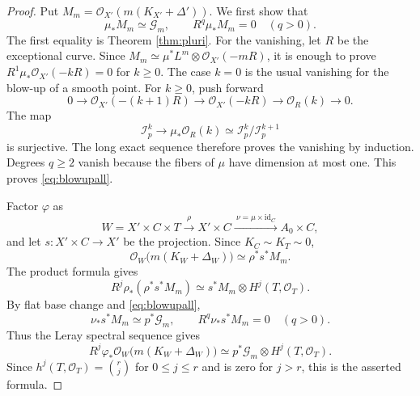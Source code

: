 \documentclass[11pt,letterpaper]{article}
\theoremstyle{paper}
\newcommand{\OO}{\mathcal O}
\newcommand{\GG}{\mathcal G}
\newcommand{\II}{\mathcal I}
\begin{document}
\begin{proof}
Put $M_m=\OO_{X'}(m(K_{X'}+\Delta'))$. We first show that
\begin{equation}\label{eq:blowupall}
\mu_*M_m\simeq\GG_m,\qquad R^q\mu_*M_m=0\quad(q>0).
\end{equation}
The first equality is Theorem \ref{thm:pluri}. For the vanishing, let $R$ be the exceptional curve. Since $M_m\simeq\mu^*L^m\otimes\OO_{X'}(-mR)$, it is enough to prove $R^1\mu_*\OO_{X'}(-kR)=0$ for $k\ge0$. The case $k=0$ is the usual vanishing for the blow-up of a smooth point. For $k\ge0$, push forward
\[
0\longrightarrow\OO_{X'}(-(k+1)R)\longrightarrow\OO_{X'}(-kR)
\longrightarrow\OO_R(k)\longrightarrow0.
\]
The map
\[
\II_p^k\longrightarrow\mu_*\OO_R(k)
\simeq\II_p^k/\II_p^{k+1}
\]
is surjective. The long exact sequence therefore proves the vanishing by induction. Degrees $q\ge2$ vanish because the fibers of $\mu$ have dimension at most one. This proves \eqref{eq:blowupall}.

Factor $\varphi$ as
\[
W=X'\times C\times T\xrightarrow{\ \rho\ }X'\times C
\xrightarrow{\ \nu=\mu\times\mathrm{id}_C\ }A_0\times C,
\]
and let $s:X'\times C\to X'$ be the projection. Since $K_C\sim K_T\sim0$,
\[
\OO_W\bigl(m(K_W+\Delta_W)\bigr)\simeq\rho^*s^*M_m.
\]
The product formula gives
\[
R^j\rho_*(\rho^*s^*M_m)\simeq s^*M_m\otimes H^j(T,\OO_T).
\]
By flat base change and \eqref{eq:blowupall},
\[
\nu_*s^*M_m\simeq p^*\GG_m,\qquad R^q\nu_*s^*M_m=0\quad(q>0).
\]
Thus the Leray spectral sequence gives
\[
R^j\varphi_*\OO_W\bigl(m(K_W+\Delta_W)\bigr)
\simeq p^*\GG_m\otimes H^j(T,\OO_T).
\]
Since $h^j(T,\OO_T)=\binom rj$ for $0\le j\le r$ and is zero for $j>r$, this is the asserted formula.


\end{proof}
\end{document}
